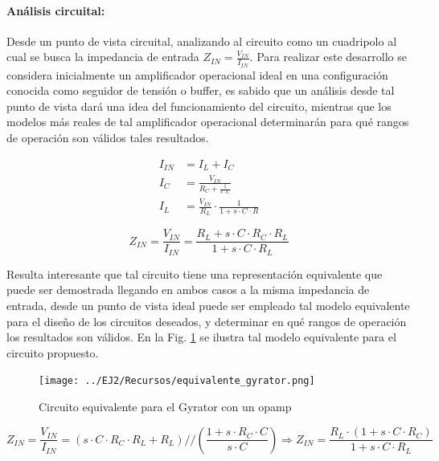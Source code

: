 \paragraph*{An\'alisis circuital: } Desde un punto de vista circuital, analizando al circuito como un cuadripolo al cual se busca la impedancia de entrada $Z_{IN} = \frac{V_{IN}}{I_{IN}}$.
Para realizar este desarrollo se considera inicialmente un amplificador operacional ideal en una configuraci\'on conocida como seguidor de tensi\'on o buffer, es sabido que un an\'alisis desde tal punto de vista
dar\'a una idea del funcionamiento del circuito, mientras que los modelos m\'as reales de tal amplificador operacional determinar\'an para qu\'e rangos de operaci\'on son v\'alidos tales resultados.

\begin{eqnarray*}
    I_{IN} & = I_L + I_C \\
    I_C & = \frac{V_{IN}}{R_C + \frac{1}{s \cdot C}} \\
    I_L & = \frac{V_{IN}}{R_L} \cdot \frac{1}{1 + s \cdot C \cdot R}
\end{eqnarray*}

\begin{equation}
    Z_{IN} = \frac{V_{IN}}{I_{IN}} = \frac{R_L + s \cdot C \cdot R_C \cdot R_L}{1 + s \cdot C \cdot R_L}
\end{equation}

Resulta interesante que tal circuito tiene una representaci\'on equivalente que puede ser demostrada llegando en ambos casos a la misma impedancia de entrada,
desde un punto de vista ideal puede ser empleado tal modelo equivalente para el dise\~no de los circuitos deseados, y determinar en qu\'e rangos de operaci\'on los resultados
son v\'alidos. En la Fig. \ref{fig:equivalente_gyrator} se ilustra tal modelo equivalente para el circuito propuesto.

\begin{figure}[H]
    \centering
    \texttt{[image: ../EJ2/Recursos/equivalente\_gyrator.png]}
    \caption{Circuito equivalente para el Gyrator con un opamp}
    \label{fig:equivalente_gyrator}
\end{figure}

\begin{equation}
    Z_{IN} = \frac{V_{IN}}{I_{IN}} = (s \cdot C \cdot R_C \cdot R_L + R_L) // (\frac{1 + s \cdot R_C \cdot C}{s \cdot C})
    \Rightarrow Z_{IN} = \frac{R_L \cdot (1 + s \cdot C \cdot R_C)}{1 + s \cdot C \cdot R_L}
\end{equation}

